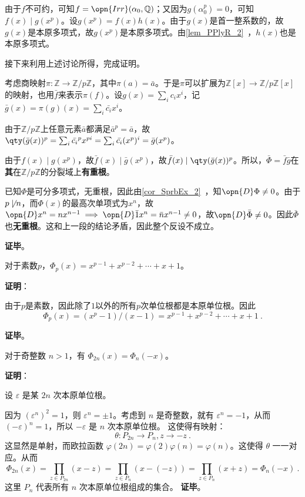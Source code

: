 由于$f$不可约，可知$f=\opn{Irr}(\alpha_0, \mathbb{Q})$；又因为$g(\alpha_0^p)=0$，可知$f(x)\mid g(x^p)$。设$g(x^p)=f(x)h(x)$。由于$g(x)$是首一整系数的，故$g(x)$是本原多项式，故$g(x^p)$是本原多项式。由\autoref{lem_PPlyR_2}~，$h(x)$也是本原多项式。

接下来利用上述讨论所得，完成证明。

考虑商映射$\pi:\mathbb{Z}\to\mathbb{Z}/p\mathbb{Z}$，其中$\pi(a)=\bar{a}$。于是$\pi$可以扩展为$\mathbb{Z}[x]\to\mathbb{Z}/p\mathbb{Z}[x]$的映射，也用$\bar{f}$来表示$\pi(f)$。设$g(x)=\sum_i c_ix^i$，记$\bar{g}(x)=\pi(g)(x)=\sum_i \bar{c_i}x^i$。

由于$\mathbb{Z}/p\mathbb{Z}$上任意元素$\bar{a}$都满足$\bar{a}^p=\bar{a}$，故$\qty(\bar{g}(x))^p=\sum_i\bar{c_i}^px^{pi}=\sum_i \bar{c_i}(x^p)^i=\bar{g}(x^p)$。

由于$f(x)\mid g(x^p)$，故$\bar{f}(x)\mid \bar{g}(x^p)$，故$\bar{f}(x)\mid \qty(\bar{g}(x))^p$。所以，$\bar{\Phi}=\bar{f}\bar{g}$在\textbf{其}在$\mathbb{Z}/p\mathbb{Z}$的分裂域上\textbf{有重根}。

已知$\Phi$是可分多项式，无重根，因此由\autoref{cor_SprbEx_2}~，知$\opn{D}\Phi\neq 0$。由于$p\not\mid n$，而$\Phi(x)$的最高次单项式为$x^n$，故$\opn{D}x^n=nx^{n-1}\implies \opn{D} \bar{1}x^n=\bar{n}x^{n-1}\neq 0$，故$\opn{D}\bar{\Phi}\neq 0$。因此$\bar{\Phi}$也\textbf{无重根}。这和上一段的结论矛盾，因此整个反设不成立。

\textbf{证毕}。



\begin{theorem}{}
对于素数$p$，$\Phi_p(x)=x^{p-1}+x^{p-2}+\cdots+x+1$。
\end{theorem}

\textbf{证明}：

由于$p$是素数，因此除了$1$以外的所有$p$次单位根都是本原单位根。因此
\begin{equation}
\Phi_p(x) = (x^p-1)/(x-1) = x^{p-1}+x^{p-2}+\cdots+x+1~.
\end{equation}

\textbf{证毕}。



\begin{theorem}{}\label{the_Cycltm_6}
对于奇整数 $n>1$，有 $\Phi_{2n}(x) = \Phi_n(-x)$。
\end{theorem}

\textbf{证明}：

设 $\varepsilon$ 是某 $2n$ 次本原单位根。

因为 $(\varepsilon^n)^2 = 1$，则 $\varepsilon^n = \pm 1$。考虑到 $n$ 是奇整数，就有 $\varepsilon^n = -1$，从而 $(-\varepsilon)^n = 1$，所以 $-\varepsilon$ 是 $n$ 次本原单位根。
这使得有映射：
$$\theta: P_{2n} \rightarrow P_n, z \rightarrow -z ~.$$
这显然是单射，而欧拉函数 $\varphi(2n) = \varphi(2)\varphi(n) = \varphi(n)$。这使得 $\theta$ 一一对应。从而
$$\Phi_{2n}(x) = \prod_{z \in P_{2n}} (x-z) = \prod_{z \in P_n} (x-(-z)) = \prod_{z \in P_n} (x+z) = \Phi_n(-x)~.$$
这里 $P_n$ 代表所有 $n$ 次本原单位根组成的集合。
\textbf{证毕}。




